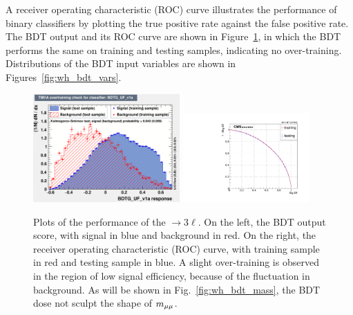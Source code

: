 A receiver operating characteristic (ROC) curve illustrates the performance of binary classifiers 
by plotting the true positive rate against the false positive rate.
The BDT output and its ROC curve are shown in Figure~\ref{fig:wh_bdt_output}, 
in which the BDT performs the same on training and testing samples, indicating no over-training.
Distributions of the BDT input variables are shown in Figures~\ref{fig:wh_bdt_vars}.


\begin{figure}[!htb]
      \centering
      \captionsetup{justification=justified}
      \includegraphics[width=0.50\textwidth]{pics/VH_sec/BDT_train_WH/WH_BDT_overtrain.pdf}
      \includegraphics[width=0.43\textwidth]{pics/VH_sec/BDT_train_WH/WH_BDT_ROC.pdf}
      \caption{Plots of the performance of the \WH $\to 3\ell$. 
               On the left, the BDT output score, with signal in blue and background in red.  
               On the right, the receiver operating characteristic (ROC) curve, 
               with training sample in red and testing sample in blue. 
               A slight over-training is observed in the region of low signal efficiency, because of the fluctuation in background. 
               As will be shown in Fig.~\ref{fig:wh_bdt_mass}, the BDT dose not sculpt the shape of $m_{\mu\mu}$.}
      \label{fig:wh_bdt_output}
  \end{figure}
  

